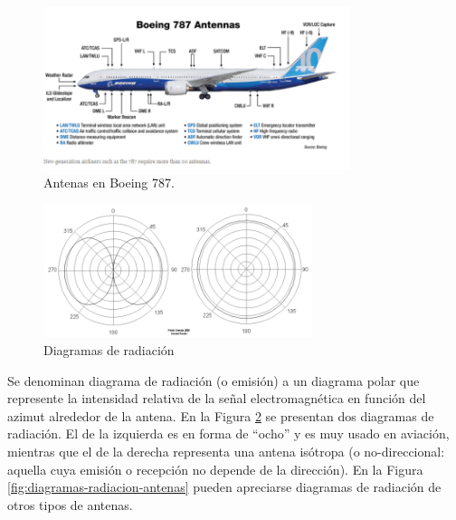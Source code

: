   \begin{figure}[!h]
    \centering
  \includegraphics[width=0.8\textwidth]{06.radionavegacion/Imagenes/06.00.ondas.electromagneticas/787-antenas.png}  
    \caption{Antenas en Boeing 787. \protect\cite{Boeing787_antenas}}
      \label{fig:06.antenas.boeing.787}
  \end{figure}



\begin{figure}[!h]
  \centering
  \includegraphics[width=0.7\textwidth]{06.radionavegacion/Imagenes/06.01.adf/diagramas-radiacion.png}
  \caption{Diagramas de radiaci\'on \protect\cite{wikipedia_esp}}
  \label{fig:diagramas-radiacion}
\end{figure}

 Se denominan diagrama de radiaci\'on (o
  emisi\'on) a un diagrama polar que represente la intensidad relativa
  de la se\~nal electromagn\'etica en funci\'on del azimut alrededor
  de la antena.  En la Figura \ref{fig:diagramas-radiacion} se
  presentan dos diagramas de radiaci\'on. El de la izquierda es en
  forma de ``ocho'' y es muy usado en aviaci\'on, mientras que el de
  la derecha representa una antena is\'otropa (o no-direccional:
  aquella cuya emisi\'on o recepci\'on no depende de la direcci\'on).
En la Figura \ref{fig:diagramas-radiacion-antenas} pueden apreciarse diagramas de radiaci\'on 
de otros tipos de antenas.




